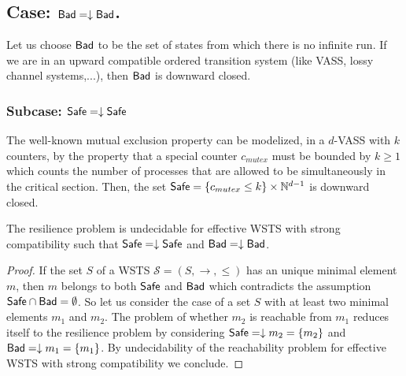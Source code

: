 




\subsection{Case: $\textsf{Bad}=\downarrow \textsf{Bad}$.}

%
%
Let us choose $\textsf{Bad}$ to be the set of states from which there is no infinite run. If we are in an upward compatible ordered transition system (like VASS, lossy channel systems,...), then $\textsf{Bad}$ is downward closed.

\subsubsection{Subcase: $\textsf{Safe}=\downarrow \textsf{Safe}$}

The well-known mutual exclusion property can be modelized, in a $d$-VASS with $k$ counters, by the property that a special counter $c_{mutex}$ must be bounded by $k \geq 1$ which counts the number of processes that are allowed to be simultaneously in the critical section. Then, the set $\textsf{Safe} =  \{c_{mutex} \leq k\} \times \mathbb{N}^{d-1}$ is downward closed.


\begin{theorem}\label{down-down}
The resilience problem is undecidable for  effective WSTS with  strong  compatibility such that
$\textsf{Safe}=\downarrow \textsf{Safe}$
and $\textsf{Bad}=\downarrow \textsf{Bad}$.
\end{theorem}

\begin{proof}
If the set $S$ of a WSTS $\mathscr{S}=(S,\rightarrow, \leq)$ has an unique minimal element $m$, then $m$ belongs to both $\textsf{Safe}$ and $\textsf{Bad}$ which contradicts the assumption $\textsf{Safe} \cap \textsf{Bad}= \emptyset$. So let us consider the case of a set $S$ with at least two minimal elements $m_1$ and $m_2$.
The problem of whether $m_2$ is reachable from $m_1$ reduces itself to the resilience problem by considering $\textsf{Safe}=\downarrow m_2 = \{ m_2\}$ and $\textsf{Bad}=\downarrow m_1 = \{ m_1\}$. By undecidability of the reachability problem for effective WSTS with strong compatibility we conclude.  
\end{proof}

